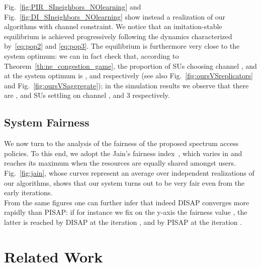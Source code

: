 \documentclass[12pt, onecolumn]{IEEEtran}
\theoremstyle{plain}
\theoremstyle{definition}
\begin{document}
Fig.~\ref{fig:PIR_SIneighbors_NOlearning} and Fig.~\ref{fig:DI_SIneighbors_NOlearning} show instead a realization of our algorithms with channel constraint.
We notice that an imitation-stable equilibrium is achieved progressively following the dynamics characterized by~\eqref{eq:pop2} and \eqref{eq:pop3}.
The equilibrium is furthermore very close to the system optimum: we can in fact check that, according to Theorem~\ref{th:ne_congestion_game}, the proportion of SUs choosing channel ,  and  at the system optimum is ,  and  respectively (see also Fig.~\ref{fig:oursVSreplicators} and Fig.~\ref{fig:oursVSaggregate});
in the simulation results we observe that there are ,  and  SUs settling on channel ,  and 3 respectively.


\subsection{System Fairness}



We now turn to the analysis of the fairness of the proposed spectrum access policies. To this end, we adopt the Jain's fairness index~\cite{jains84}, which varies in  and reaches its maximum when
the resources are equally shared amongst users. Fig.~\ref{fig:jain}, whose curves represent an average over  independent realizations of our algorithms, shows that our system turns out to be very fair
even from the early iterations.\\
From the same figures one can further infer that indeed DISAP converges more rapidly than PISAP: if for instance we fix on the y-axis the fairness value , the latter
is reached by DISAP at the iteration , and by PISAP at the iteration .








\section{Related Work}
\label{sec:related_work}
\end{document}

